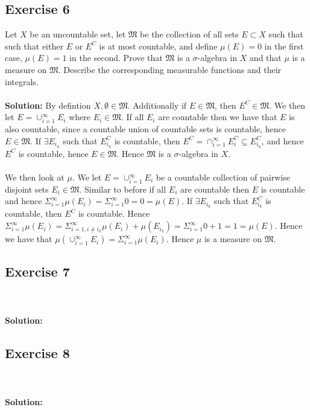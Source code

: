 \documentclass{article}
\begin{document}
\subsection*{Exercise 6}
Let $X$ be an uncountable set, let $\mathfrak{M}$ be the collection of all sets $E \subset X$ such that
such that either $E$ or $E^C$ is at most countable, and define $\mu(E) = 0$ in the first case, $\mu(E)=1$ in the
second. Prove that $\mathfrak{M}$ is a $\sigma$-algebra in $X$ and that $\mu$ is a measure on $\mathfrak{M}$. Describe
the corresponding measurable functions and their integrals.
\\\\
\textbf{Solution:}
By defintion $X,  \emptyset \in \mathfrak{M}$. Additionally if $E \in \mathfrak{M}$, then $E^C \in \mathfrak{M}$.
We then let $E = \cup_{i=1}^{\infty} E_i$ where $E_i \in \mathfrak{M}$. If all $E_i$ are countable then we have that $E$ is
also countable, since a countable union of countable sets is countable, hence $E \in \mathfrak{M}$. If $\exists E_{i_u}$ such that $E_{i_u}^C$ is countable,
then $E^C = \cap_{i=1}^{\infty}E_i^C \subseteq E_{i_u}^C$, and hence $E^C$ is countable, hence $E \in \mathfrak{M}$. Hence $\mathfrak{M}$ is a $\sigma$-algebra in $X$.
\\\\
We then look at $\mu$. We let $E = \cup_{i=1}^{\infty}E_i$ be a countable collection of pairwise disjoint sets $E_i \in \mathfrak{M}$. Similar to before
if all $E_{i}$ are countable then $E$ is countable and hence $\Sigma_{i=1}^{\infty}\mu(E_i) = \Sigma_{i=1}^{\infty} 0 = 0= \mu(E)$.
If $\exists E_{i_{k}}$ such that $E_{i_{k}}^C$ is countable, then $E^C$ is countable. Hence $\Sigma_{i=1}^{\infty}\mu(E_i) = \Sigma_{i=1, i \neq i_k}^{\infty} \mu(E_i) + \mu(E_{i_k}) = \Sigma_{i=1}^{\infty}0 + 1 = 1 = \mu(E)$.
Hence we have that $\mu(\cup_{i=1}^{\infty}E_i) = \Sigma_{i=1}^{\infty}\mu(E_i)$. Hence $\mu$ is a measure on $\mathfrak{M}$.
\subsection*{Exercise 7}
\\\\
\textbf{Solution:}

\subsection*{Exercise 8}
\\\\
\textbf{Solution:}
\end{document}
